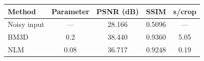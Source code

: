\begin{tabular}{@{}lcccc@{}}
\toprule
\textbf{Method} & \textbf{Parameter} & \textbf{PSNR (dB)} & \textbf{SSIM} & \textbf{s/crop} \\
\midrule
Noisy input & --- & 28.166 & 0.5096 & --- \\
BM3D & 0.2 & 38.440 & 0.9360 & 5.05 \\
NLM & 0.08 & 36.717 & 0.9248 & 0.19 \\
\bottomrule
\end{tabular}
